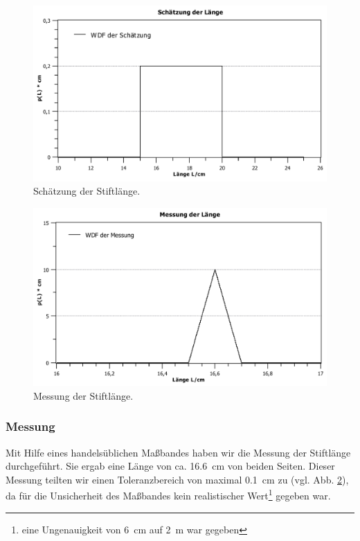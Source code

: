 \documentclass[11pt,a4paper,titlepage, ngerman]{article}
\begin{document}
				\begin{figure}						
					\centering
					\includegraphics[scale=0.8]{Laengenschaetzung.pdf}				
					\caption{Schätzung der Stiftlänge.}
					\label{fig:laenge}
				\end{figure}
				\begin{figure}						
					\centering
					\includegraphics[scale=0.8]{Laengenmessung.pdf}				
					\caption{Messung der Stiftlänge.}
					\label{fig:laenge2}
				\end{figure}
			
			\subsubsection{Messung}
				\label{2.2.2}
				
				Mit Hilfe eines handelsüblichen Maßbandes haben wir die Messung der Stiftlänge durchgeführt. 
				Sie ergab eine Länge von ca. \SI{16,6}{\cm} von beiden Seiten. Dieser Messung teilten wir einen Toleranzbereich von maximal \SI{0,1}{\cm} zu (vgl. Abb. \ref{fig:laenge2}), da für die Unsicherheit des Maßbandes kein realistischer Wert\footnote{eine Ungenauigkeit von \SI{6}{\cm} auf \SI{2}{\m} war gegeben} gegeben war.
			
\end{document}
